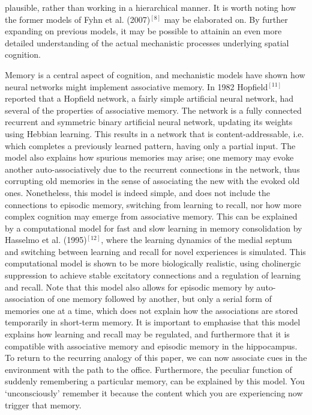 plausible, rather than working in a hierarchical manner. It is worth noting how the former models of Fyhn et al. (2007)$^{[8]}$ may be elaborated on. By further expanding on previous models, it may be possible to attainin an even more detailed understanding of the actual mechanistic processes underlying spatial cognition.

Memory is a central aspect of cognition, and mechanistic models have shown how neural networks might implement associative memory. In 1982 Hopfield$^{[11]}$ reported that a Hopfield network, a fairly simple artificial neural network, had several of the properties of associative memory. The network is a fully connected recurrent and symmetric binary artificial neural network, updating its weights using Hebbian learning. This results in a network that is content-addressable, i.e. which completes a previously learned pattern, having only a partial input. The model also explains how spurious memories may arise; one memory may evoke another auto-associatively due to the recurrent connections in the network, thus corrupting old memories in the sense of associating the new with the evoked old ones. Nonetheless, this model is indeed simple, and does not include the connections to episodic memory, switching from learning to recall, nor how more complex cognition may emerge from associative memory. This can be explained by a computational model for fast and slow learning in memory consolidation by Hasselmo et al. (1995)$^{[12]}$, where the learning dynamics of the medial septum and switching between learning and recall for novel experiences is simulated. This computational model is shown to be more biologically realistic, using cholinergic suppression to achieve stable excitatory connections and a regulation of learning and recall. Note that this model also allows for episodic memory by auto-association of one memory followed by another, but only a serial form of memories one at a time, which does not explain how the associations are stored temporarily in short-term memory. It is important to emphasise that this model explains how learning and recall may be regulated, and furthermore that it is compatible with associative memory and episodic memory in the hippocampus. To return to the recurring analogy of this paper, we can now associate cues in the environment with the path to the office. Furthermore, the peculiar function of suddenly remembering a particular memory, can be explained by this model. You ‘unconsciously’ remember it because the content which you are experiencing now trigger that memory.

